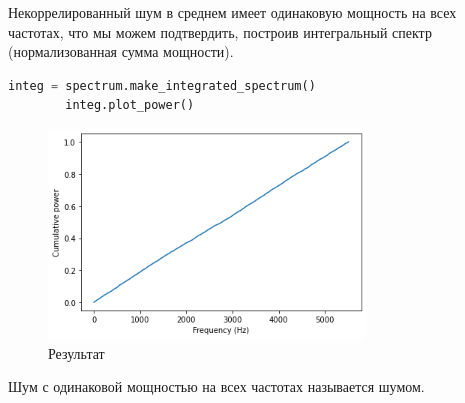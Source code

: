 \documentclass[a4paper, 12pt]{report}
\begin{document}
	Некоррелированный шум в среднем имеет одинаковую мощность на всех частотах, что мы можем подтвердить, построив интегральный спектр (нормализованная сумма мощности).
	\begin{lstlisting}[language=Python,caption=Строим интегральный спектр шума]
		integ = spectrum.make_integrated_spectrum()
		integ.plot_power()
	\end{lstlisting}
	\begin{figure}[H]
		\centering
		\includegraphics[width=0.75\textwidth]{uun3.png}
		\caption{Результат}
		\label{fig:uun3}
	\end{figure}
	Шум с одинаковой мощностью на всех частотах называется  шумом.
\end{document}
